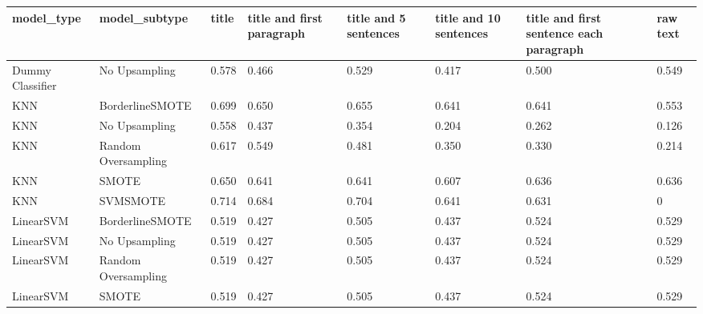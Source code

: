 \begin{tabular}{llllllll}
\toprule
                  model\_type &       model\_subtype & title & title and first paragraph & title and 5 sentences & title and 10 sentences & title and first sentence each paragraph &  raw text \\
\midrule
            Dummy Classifier &       No Upsampling & 0.578 &                     0.466 &                 0.529 &                  0.417 &                                   0.500 &     0.549 \\
                         KNN &     BorderlineSMOTE & 0.699 &                     0.650 &                 0.655 &                  0.641 &                                   0.641 &     0.553 \\
                         KNN &       No Upsampling & 0.558 &                     0.437 &                 0.354 &                  0.204 &                                   0.262 &     0.126 \\
                         KNN & Random Oversampling & 0.617 &                     0.549 &                 0.481 &                  0.350 &                                   0.330 &     0.214 \\
                         KNN &               SMOTE & 0.650 &                     0.641 &                 0.641 &                  0.607 &                                   0.636 &     0.636 \\
                         KNN &            SVMSMOTE & 0.714 &                     0.684 &                 0.704 &                  0.641 &                                   0.631 &         0 \\
                   LinearSVM &     BorderlineSMOTE & 0.519 &                     0.427 &                 0.505 &                  0.437 &                                   0.524 &     0.529 \\
                   LinearSVM &       No Upsampling & 0.519 &                     0.427 &                 0.505 &                  0.437 &                                   0.524 &     0.529 \\
                   LinearSVM & Random Oversampling & 0.519 &                     0.427 &                 0.505 &                  0.437 &                                   0.524 &     0.529 \\
                   LinearSVM &               SMOTE & 0.519 &                     0.427 &                 0.505 &                  0.437 &                                   0.524 &     0.529 \\

\end{tabular}
